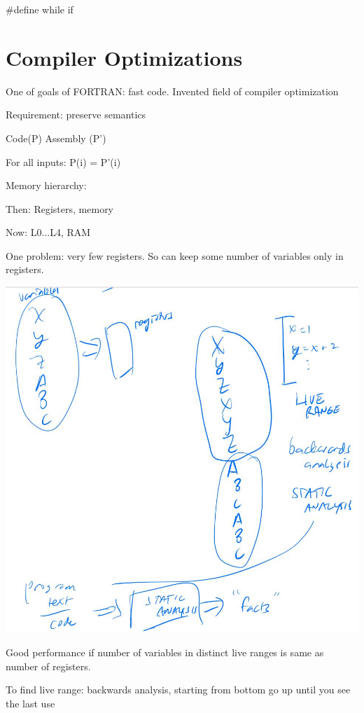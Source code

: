 \documentclass[twoside]{article}
\begin{document}
\hspace{1cm}\#define while if

\section{Compiler Optimizations}

One of goals of FORTRAN: fast code. Invented field of compiler optimization

Requirement: preserve semantics

Code(P)  Assembly (P')

For all inputs: P(i) = P'(i)

Memory hierarchy:

Then: Registers, memory

Now: L0...L4, RAM

One problem: very few registers. So can keep some number of variables only in registers.

\begin{center}
    \includegraphics[scale=0.32]{live_range.jpg}
\end{center}

Good performance if number of variables in distinct live ranges is same as number of registers.

To find live range: backwards analysis, starting from bottom go up until you see the last use
\end{document}
